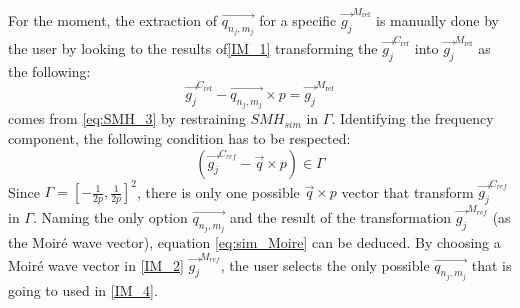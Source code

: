 \documentclass[12pt]{article}
\begin{document}
For the moment, the extraction of $\overrightarrow{q_{n_j,m_j}}$ for a specific $ \overrightarrow{g_j}^{M_{\text{ref}}}$ is manually done by the user by looking to the results of\cref{IM_1} transforming the $\overrightarrow{g_j}^{C_{\text{ref}}}$ into $\overrightarrow{g_j}^{M_{\text{ref}}}$ as the following:
\begin{equation}
\label{eq:sim_Moire}
{\overrightarrow{g_j}^{C_{\text{ref}}}}-\overrightarrow{q_{n_j,m_j}}\times p =  \overrightarrow{g_j}^{M_{\text{ref}}}
\end{equation}
 comes from \cref{eq:SMH_3} by restraining $SMH_{sim}$ in $\Gamma$. Identifying the frequency component, the following condition has to be respected:
\begin{equation*}
(\overrightarrow{g_j}^{C_{ref}}-\overrightarrow{q}\times p) \in \Gamma
\end{equation*}
Since $\Gamma = [-\frac{1}{2p},\frac{1}{2p}]^{2}$, there is only one possible $\overrightarrow{q}\times p$ vector that transform $\overrightarrow{g_j}^{C_{ref}}$ in $\Gamma$. Naming the only option $\overrightarrow{q_{n_j,m_j}}$ and the result of the transformation $\overrightarrow{g_j}^{M_{ref}}$ (as the Moir{\'e} wave vector), equation \cref{eq:sim_Moire} can be deduced. By choosing a Moir{\'e} wave vector in \cref{IM_2} $\overrightarrow{g_j}^{M_{ref}}$, the user selects the only possible $\overrightarrow{q_{n_j,m_j}}$ that is going to used in \cref{IM_4}.
\end{document}
